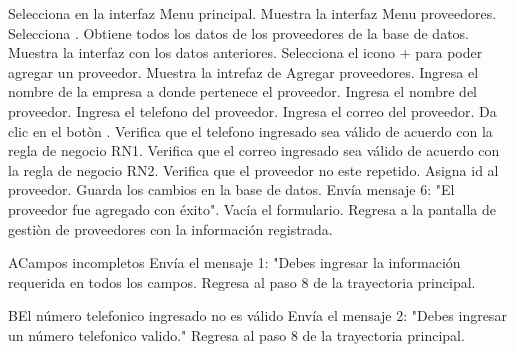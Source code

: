 \begin{UCtrayectoria}
	
	\UCpaso[\UCactor] Selecciona  en la interfaz Menu principal.
	\UCpaso[\UCsist] Muestra la interfaz Menu proveedores.
	\UCpaso[\UCactor] Selecciona .
	\UCpaso[\UCsist] Obtiene todos los datos de los proveedores de la base de datos. 
	\UCpaso[\UCsist] Muestra la interfaz con los datos anteriores.
	\UCpaso[\UCactor] Selecciona el icono + para poder agregar un proveedor.
	\UCpaso[\UCsist] Muestra la intrefaz de Agregar proveedores.
          \UCpaso[\UCactor] Ingresa el nombre de la empresa a donde pertenece el proveedor.
	\UCpaso[\UCactor] Ingresa el nombre del proveedor.
	\UCpaso[\UCactor] Ingresa el telefono del proveedor.
	\UCpaso[\UCactor] Ingresa el correo del proveedor.
	\UCpaso[\UCactor] Da clic en el botòn  . 
	\UCpaso[\UCsist] Verifica que el telefono ingresado sea válido de acuerdo con la regla de negocio RN1. 
	\UCpaso[\UCsist] Verifica que el correo ingresado sea válido de acuerdo con la regla de negocio RN2.
	\UCpaso[\UCsist] Verifica que el proveedor no este repetido. 
	\UCpaso[\UCsist] Asigna id al proveedor.
	\UCpaso[\UCsist] Guarda los cambios en la base de datos.
	\UCpaso[\UCsist] Envía mensaje 6: "El proveedor fue agregado con éxito".
	\UCpaso[\UCsist] Vacía el formulario.
	\UCpaso[\UCsist] Regresa a la pantalla de gestiòn de proveedores con la información registrada.
	
\end{UCtrayectoria}


\begin{UCtrayectoriaA}{A}{Campos incompletos}
	\UCpaso[\UCsist] Envía el mensaje 1: "Debes ingresar la información requerida en todos los campos.			
	\UCpaso[] Regresa al paso 8 de la trayectoria principal.
\end{UCtrayectoriaA}

\begin{UCtrayectoriaA}{B}{El número telefonico ingresado no es válido}
	\UCpaso[\UCsist] Envía el mensaje 2: "Debes ingresar un número telefonico valido."			
	\UCpaso[] Regresa al paso 8 de la trayectoria principal.
\end{UCtrayectoriaA}

